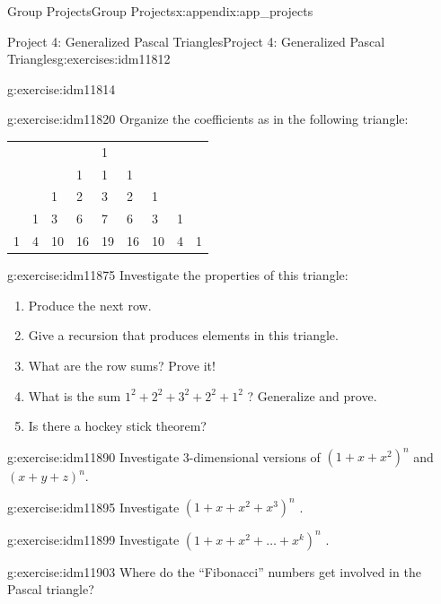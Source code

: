 \documentclass[oneside,10pt,]{book}
\numberwithin{equation}{chapter}
\begin{document}
\begin{appendixptx}{Group Projects}{}{Group Projects}{}{}{x:appendix:app_projects}
\begin{exercises-section-numberless}{Project 4: Generalized Pascal Triangles}{}{Project 4: Generalized Pascal Triangles}{}{}{g:exercises:idm11812}
\begin{divisionexercise}{1}{}{}{g:exercise:idm11814}
\end{divisionexercise}%
\begin{divisionexercise}{2}{}{}{g:exercise:idm11820}%
Organize the coefficients as in the following triangle:%
\begin{sidebyside}{1}{0.1}{0.1}{0}%
\begin{sbspanel}{0.8}%
{\centering%
\begin{tabular}{lllllllll}
&&&&1&&&&\tabularnewline[0pt]
&&&1&1&1&&&\tabularnewline[0pt]
&&1&2&3&2&1&&\tabularnewline[0pt]
&1&3&6&7&6&3&1&\tabularnewline[0pt]
1&4&10&16&19&16&10&4&1
\end{tabular}
\par}
\end{sbspanel}%
\end{sidebyside}%
\end{divisionexercise}%
\begin{divisionexercise}{3}{}{}{g:exercise:idm11875}%
Investigate the properties of this triangle:%
\begin{enumerate}[label=(\alph*)]
\item{}Produce the next row.%
\item{}Give a recursion that produces elements in this triangle.%
\item{}What are the row sums? Prove it!%
\item{}What is the sum \(1^{2} + 2^{2} + 3^{2} + 2^{2} + 1^{2}\) ? Generalize and prove.%
\item{}Is there a hockey stick theorem?%
\end{enumerate}
%
\end{divisionexercise}%
\begin{divisionexercise}{4}{}{}{g:exercise:idm11890}%
Investigate 3-dimensional versions of \(\left( 1 + x + x^{2} \right)^{n}\) and \(\left( x + y + z \right)^{n}.\)%
\end{divisionexercise}%
\begin{divisionexercise}{5}{}{}{g:exercise:idm11895}%
Investigate \(\left( 1 + x + x^{2} + x^{3} \right)^{n}\) .%
\end{divisionexercise}%
\begin{divisionexercise}{6}{}{}{g:exercise:idm11899}%
Investigate \(\left( 1 + x + x^{2} + \ldots + x^{k} \right)^{n}\) .%
\end{divisionexercise}%
\begin{divisionexercise}{7}{}{}{g:exercise:idm11903}%
Where do the ``Fibonacci'' numbers get involved in the Pascal triangle?%
\end{divisionexercise}%

\end{exercises-section-numberless}
\end{appendixptx}
\end{document}
